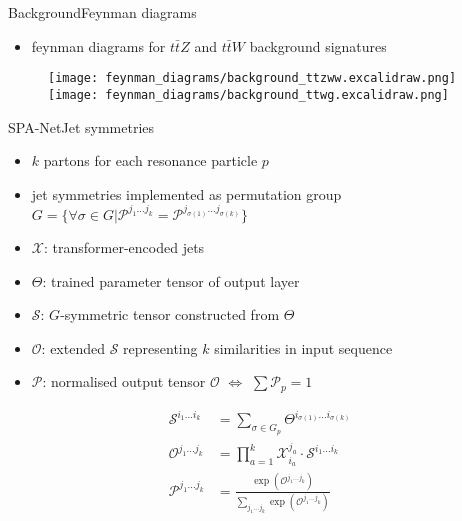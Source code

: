 \documentclass[9pt, aspectratio=169]{beamer}
\begin{document}
\appendix

\begin{frame}{Background}{Feynman diagrams}
	\begin{itemize}
		\item feynman diagrams for $t\bar{t}Z$ and $t\bar{t}W$ background signatures
	\end{itemize}

	\begin{figure}
		\centering
		\texttt{[image: feynman\_diagrams/background\_ttzww.excalidraw.png]}\hspace{10mm}
		\texttt{[image: feynman\_diagrams/background\_ttwg.excalidraw.png]}
	\end{figure}
\end{frame}

\begin{frame}{SPA-Net}{Jet symmetries}
	\begin{itemize}
		\item $k$ partons for each resonance particle $p$
		\item jet symmetries implemented as permutation group $G=\{\forall\sigma\in G | \mathcal{P}^{j_1...j_k} = \mathcal{P}^{j_{\sigma(1)}...j_{\sigma(k)}}\}$
		\item $\mathcal{X}$: transformer-encoded jets
		\item $\Theta$: trained parameter tensor of output layer
		\item $\mathcal{S}$: $G$-symmetric tensor constructed from $\Theta$
		\item $\mathcal{O}$: extended $\mathcal{S}$ representing $k$ similarities in input sequence
		\item $\mathcal{P}$: normalised output tensor $\mathcal{O}$ $\Leftrightarrow$ $\sum\mathcal{P}_p=1$
	\end{itemize}

	\begin{align*}
		\mathcal{S}^{i_1...i_k} &= \sum_{\sigma\in G_p} \Theta^{i_{\sigma(1)}...i_{\sigma(k)}}\\
		\mathcal{O}^{j_1...j_k} &= \prod_{a=1}^{k} \mathcal{X}_{i_a}^{j_a} \cdot \mathcal{S}^{i_1...i_k}\\
		\mathcal{P}^{j_1...j_k} &= \frac{\exp\left(\mathcal{O}^{j_1...j_k}\right)}{\sum_{j_1...j_k}\exp\left(\mathcal{O}^{j_1...j_k}\right)}
	\end{align*}
\end{frame}
\end{document}
